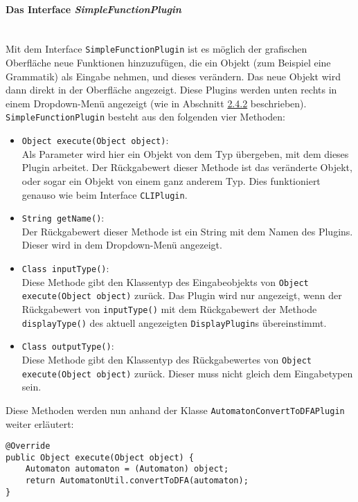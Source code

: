 \paragraph{Das Interface \textit{SimpleFunctionPlugin}}\ \\
Mit dem Interface \lstinline[columns=fixed]{SimpleFunctionPlugin} ist es möglich der grafischen Oberfläche neue Funktionen hinzuzufügen, die ein Objekt (zum Beispiel eine Grammatik) als Eingabe nehmen, und dieses verändern. Das neue Objekt wird dann direkt in der Oberfläche angezeigt. Diese Plugins werden unten rechts in einem Dropdown-Menü angezeigt (wie in Abschnitt \hyperref[sec:2.4.2]{2.4.2} beschrieben). \lstinline[columns=fixed]{SimpleFunctionPlugin} besteht aus den folgenden vier Methoden:
\begin{itemize}
	\item \lstinline[columns=fixed]{Object execute(Object object)}:\\
	Als Parameter wird hier ein Objekt von dem Typ übergeben, mit dem dieses Plugin arbeitet. Der Rückgabewert dieser Methode ist das veränderte Objekt, oder sogar ein Objekt von einem ganz anderem Typ. Dies funktioniert genauso wie beim Interface \lstinline[columns=fixed]{CLIPlugin}.
	\item \lstinline[columns=fixed]{String getName()}:\\
	Der Rückgabewert dieser Methode ist ein String mit dem Namen des Plugins. Dieser wird in dem Dropdown-Menü angezeigt.
	\item \lstinline[columns=fixed]{Class inputType()}:\\
	Diese Methode gibt den Klassentyp des Eingabeobjekts von \lstinline[columns=fixed]{Object execute(Object object)} zurück. Das Plugin wird nur angezeigt, wenn der Rückgabewert von \lstinline[columns=fixed]{inputType()} mit dem Rückgabewert der Methode \lstinline[columns=fixed]{displayType()} des aktuell angezeigten \lstinline[columns=fixed]{DisplayPlugin}s übereinstimmt.
	\item \lstinline[columns=fixed]{Class outputType()}:\\
	Diese Methode gibt den Klassentyp des Rückgabewertes von \lstinline[columns=fixed]{Object execute(Object object)} zurück. Dieser muss nicht gleich dem Eingabetypen sein.
\end{itemize}
\newpage
Diese Methoden werden nun anhand der Klasse \lstinline[columns=fixed]{AutomatonConvertToDFAPlugin} weiter erläutert:
\begin{lstlisting}[frame=single, basicstyle=\small, caption=Die Methode \textit{execute}]
@Override
public Object execute(Object object) {
	Automaton automaton = (Automaton) object;
	return AutomatonUtil.convertToDFA(automaton);
}
\end{lstlisting}
